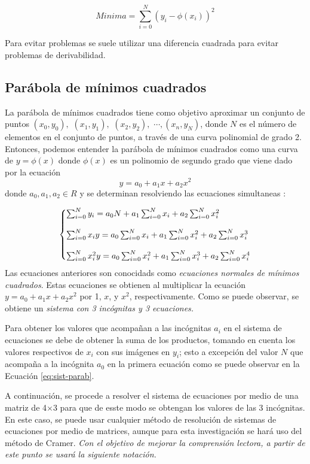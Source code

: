 \documentclass[11pt,letterpaper]{article}
\begin{document}
$$Minima = \sum_{i=0}^{N} (y_i - \phi(x_i))^2$$

Para evitar problemas se suele utilizar una diferencia cuadrada para evitar problemas de derivabilidad. 
\subsection{Parábola de mínimos cuadrados}
La parábola de mínimos cuadrados tiene como objetivo aproximar un conjunto de puntos 
$(x_0, y_0),$ $(x_1, y_1),$ $ (x_2, y_2),$ $ \cdots , (x_n, y_N)$, donde $N$ es el número de elementos en el conjunto de puntos, 
a través de una curva polinomial de grado 2. Entonces, podemos entender la parábola de mínimos cuadrados como una curva de $y=\phi(x)$ donde $\phi(x)$ es un polinomio de segundo grado que viene dado por la ecuación
$$y = a_0 + a_1 x + a_2 x^2  $$
donde $a_0, a_1, a_2 \in R$ y se determinan resolviendo las ecuaciones simultaneas : 

\begin{equation} \label{eq:sist-parab} 
	\left\{
		\begin{array}{@{}l@{}}
			\sum_{i=0}^{N} y_i  = a_0N + a_1\sum_{i=0}^{N} x_i + a_2\sum_{i=0}^{N} x_i^2 \cr\cr
			\sum_{i=0}^{N} x_iy = a_0\sum_{i=0}^{N} x_i + a_1\sum_{i=0}^{N} x_i^2 + a_2\sum_{i=0}^{N} x_i^3 \cr\cr
			\sum_{i=0}^{N} x_i^2y = a_0\sum_{i=0}^{N} x_i^2 + a_1\sum_{i=0}^{N} x_i^3 + a_2\sum_{i=0}^{N} x_i^4 		
		\end{array}
	\right.
\end{equation}
\linebreak 
Las ecuaciones anteriores  son conocidads como \textit{ecuaciones normales de mínimos cuadrados}. Estas ecuaciones se obtienen al multiplicar la ecuación $y = a_0 + a_1 x + a_2 x^2  $ por  1, $x$, y $x^2$, respectivamente. Como se puede observar, se obtiene un \emph{sistema con 3 incógnitas y 3 ecuaciones.}
\par
Para obtener los valores que acompañan a las incógnitas $a_i$ en el sistema de ecuaciones se debe de obtener la suma de los productos, tomando en cuenta los valores respectivos de $x_i$ con sus imágenes en $y_i$; esto a excepción del valor $N$ que acompaña a la incógnita $a_0$ en la primera ecuación como se puede observar en la Ecuación \ref{eq:sist-parab}.
\par
A continuación, se procede a resolver el sistema de ecuaciones por medio de una matriz de 4$\times$3 para que de esste modo se obtengan los valores de las 3 incógnitas. \cite{spiegel}\cite{nieves2011metodos} En este caso, se puede usar cualquier método de resolución de sistemas de ecuaciones por medio de matrices, aunque para esta investigación se hará uso del método de Cramer. \emph{ Con el objetivo de mejorar la comprensión lectora, a partir de este punto se usará la siguiente notación.}
\end{document}
